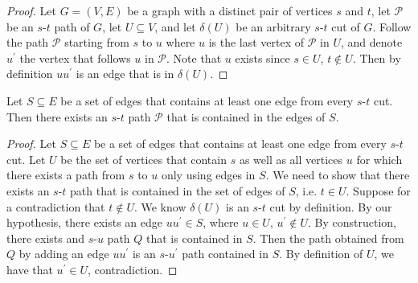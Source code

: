 \begin{proof}
    Let $ G=(V,E) $ be a graph with a distinct pair of vertices $ s $ and $ t $,
    let $ \mathcal{P} $ be an $ s $-$ t $ path of $ G $,  let $ U\subseteq V $,
    and let $ \delta(U) $ be an arbitrary $ s $-$ t $ cut of $ G $. Follow
    the path $ \mathcal{P} $ starting from $ s $ to $ u $ where $ u $ is the last vertex
    of $ \mathcal{P} $ in $ U $, and denote $ u^\prime $ the vertex that follows
    $ u $ in $ \mathcal{P} $. Note that $ u $ exists since $ s\in U $, $ t\notin U $.
    Then by definition $ uu^\prime $ is an edge that is in $ \delta(U) $.
\end{proof}

\begin{thmbox}
    \begin{theorem}
        Let $ S\subseteq E $ be a set of edges that contains at least one edge from every
        $s$-$t$ cut. Then there exists an $s$-$t$ path $ \mathcal{P} $ that is contained
        in the edges of $ S $.
    \end{theorem}
\end{thmbox}

\begin{proof}
    Let $ S\subseteq E $ be a set of edges that contains at least one edge from every
    $s$-$t$ cut. Let $ U $ be the set of vertices that contain $ s $ as well
    as all vertices $ u $ for which there exists a path from $ s $ to
    $ u $ only using edges in $ S $. We need to show that there exists
    an $s$-$t$ path that is contained in the set of edges of $ S $, i.e.
    $ t\in U $. Suppose for a contradiction that $ t\notin U $. We know
    $ \delta(U) $ is an $s$-$t$ cut by definition. By our hypothesis,
    there exists an edge $ uu^\prime\in S $, where $ u\in U $, $ u^\prime\notin U $.
    By construction, there exists and $s$-$u$ path $Q$ that is contained in $ S $.
    Then the path obtained from $ Q $ by adding an edge $ uu^\prime $ is
    an $s$-$u^\prime$ path contained in $ S $. By definition of $ U $,
    we have that $ u^\prime\in U $, contradiction.
\end{proof}

\begin{figure}
    \centering
    \def\svgwidth{\columnwidth}
    \scalebox{0.5}{}
\end{figure}


